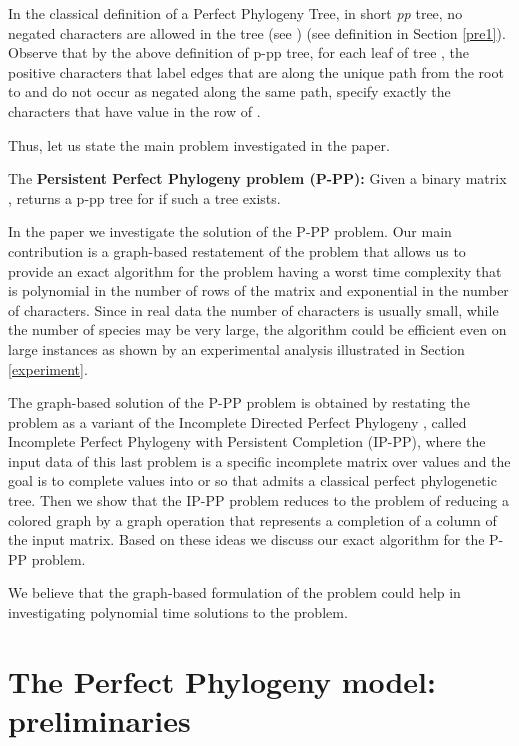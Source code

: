 \documentclass{llncs}
\begin{document}
In the classical  definition of a  Perfect Phylogeny Tree,  in short {\em pp} tree, 
no negated characters are allowed in the tree (see \cite{Setubal}) (see definition in Section \ref{pre1}). Observe that by the above definition  of p-pp tree,  for each  leaf  of tree , the positive characters that label edges 
that are along the unique path from the root to  and
do not occur as  negated along the same path, specify  exactly the characters
that have value  in the row     of .

Thus, let us state the main problem investigated in the paper.

\noindent

{The \bf  Persistent Perfect Phylogeny
 problem (P-PP):} Given a binary matrix ,  returns a p-pp tree for  if such a tree exists.
 

 
 \vspace{.2in}
 
 In the paper we investigate the  solution of the P-PP problem. Our main contribution is a graph-based restatement of the problem that allows us to provide an exact algorithm for the problem having a worst time complexity that is polynomial in the number   of rows of the matrix and exponential   in the number  of characters.  
Since in  real data the number of characters is usually small, while the number of species may be very large, the algorithm could be  efficient even on large instances  as shown by an experimental analysis illustrated in Section \ref{experiment}.
 


 The graph-based solution of   the P-PP problem is obtained by  restating the problem as a  variant of the Incomplete Directed Perfect Phylogeny \cite{Sha}, called Incomplete  Perfect Phylogeny with Persistent Completion (IP-PP), where the input data of this last problem is a specific incomplete matrix   over values   and the goal is to complete values  into  or  so that  admits a classical perfect phylogenetic tree.
Then we show  that the IP-PP problem reduces to the problem of reducing a colored graph by a graph operation  that represents  a completion of a column of the input matrix.    Based on these ideas we discuss our exact algorithm for the P-PP problem.
 
  We believe that the graph-based formulation of the problem could help in investigating polynomial time solutions to the problem. 

 

 
 \section{The Perfect Phylogeny model: preliminaries}
 
\end{document}
